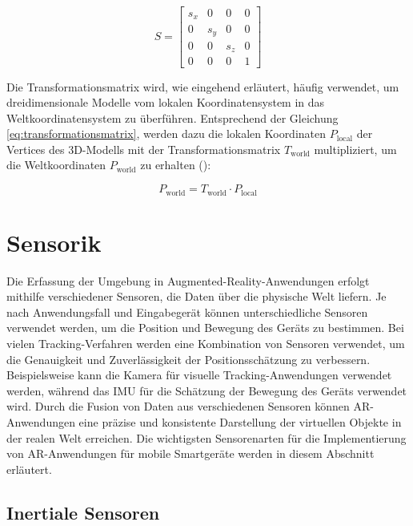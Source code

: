 \begin{equation}
    S = 
    \begin{bmatrix} 
        s_x & 0 & 0 & 0 \\ 
        0 & s_y & 0 & 0 \\ 
        0 & 0 & s_z & 0 \\ 
        0 & 0 & 0 & 1 
    \end{bmatrix}
\end{equation}

Die Transformationsmatrix wird, wie eingehend erläutert, häufig verwendet, um dreidimensionale Modelle vom lokalen Koordinatensystem in das Weltkoordinatensystem zu überführen. Entsprechend der Gleichung \ref{eq:transformationsmatrix}, werden dazu die lokalen Koordinaten \( P_{\text{local}} \) der Vertices des 3D-Modells mit der Transformationsmatrix \( T_{\text{world}} \) multipliziert, um die Weltkoordinaten \( P_{\text{world}} \) zu erhalten (\cite{doerner2022virtual, gao2021vSLAM, freescale2010math3d}):

\begin{equation}
    P_{\text{world}} = T_{\text{world}} \cdot P_{\text{local}}
\end{equation}

\section{Sensorik}

Die Erfassung der Umgebung in Augmented-Reality-Anwendungen erfolgt mithilfe verschiedener Sensoren, die Daten über die physische Welt liefern. Je nach Anwendungsfall und Eingabegerät können unterschiedliche Sensoren verwendet werden, um die Position und Bewegung des Geräts zu bestimmen. Bei vielen Tracking-Verfahren werden eine Kombination von Sensoren verwendet, um die Genauigkeit und Zuverlässigkeit der Positionsschätzung zu verbessern. Beispielsweise kann die Kamera für visuelle Tracking-Anwendungen verwendet werden, während das IMU für die Schätzung der Bewegung des Geräts verwendet wird. Durch die Fusion von Daten aus verschiedenen Sensoren können AR-Anwendungen eine präzise und konsistente Darstellung der virtuellen Objekte in der realen Welt erreichen. Die wichtigsten Sensorenarten für die Implementierung von AR-Anwendungen für mobile Smartgeräte werden in diesem Abschnitt erläutert. \cite{doerner2022virtual}

\subsection{Inertiale Sensoren}

